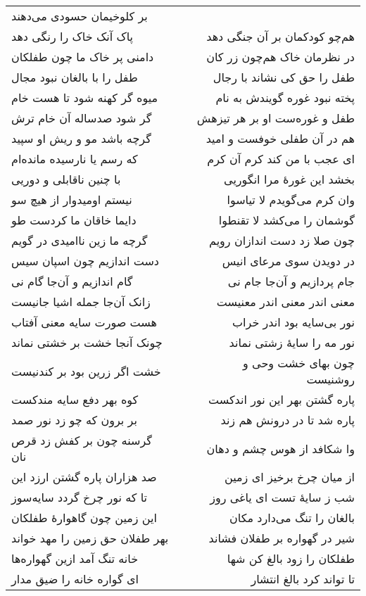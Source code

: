 \begin{center}
\begin{longtable}{l p{0.5cm} r}
بر کلوخیمان حسودی می‌دهند
\\
پاک آنک خاک را رنگی دهد
&&
هم‌چو کودکمان بر آن جنگی دهد
\\
دامنی پر خاک ما چون طفلکان
&&
در نظرمان خاک هم‌چون زر کان
\\
طفل را با بالغان نبود مجال
&&
طفل را حق کی نشاند با رجال
\\
میوه گر کهنه شود تا هست خام
&&
پخته نبود غوره گویندش به نام
\\
گر شود صدساله آن خام ترش
&&
طفل و غوره‌ست او بر هر تیزهش
\\
گرچه باشد مو و ریش او سپید
&&
هم در آن طفلی خوفست و امید
\\
که رسم یا نارسیده مانده‌ام
&&
ای عجب با من کند کرم آن کرم
\\
با چنین ناقابلی و دوریی
&&
بخشد این غورهٔ مرا انگوریی
\\
نیستم اومیدوار از هیچ سو
&&
وان کرم می‌گویدم لا تیاسوا
\\
دایما خاقان ما کردست طو
&&
گوشمان را می‌کشد لا تقنطوا
\\
گرچه ما زین ناامیدی در گویم
&&
چون صلا زد دست اندازان رویم
\\
دست اندازیم چون اسپان سیس
&&
در دویدن سوی مرعای انیس
\\
گام اندازیم و آن‌جا گام نی
&&
جام پردازیم و آن‌جا جام نی
\\
زانک آن‌جا جمله اشیا جانیست
&&
معنی اندر معنی اندر معنیست
\\
هست صورت سایه معنی آفتاب
&&
نور بی‌سایه بود اندر خراب
\\
چونک آنجا خشت بر خشتی نماند
&&
نور مه را سایهٔ زشتی نماند
\\
خشت اگر زرین بود بر کندنیست
&&
چون بهای خشت وحی و روشنیست
\\
کوه بهر دفع سایه مندکست
&&
پاره گشتن بهر این نور اندکست
\\
بر برون که چو زد نور صمد
&&
پاره شد تا در درونش هم زند
\\
گرسنه چون بر کفش زد قرص نان
&&
وا شکافد از هوس چشم و دهان
\\
صد هزاران پاره گشتن ارزد این
&&
از میان چرخ برخیز ای زمین
\\
تا که نور چرخ گردد سایه‌سوز
&&
شب ز سایهٔ تست ای یاغی روز
\\
این زمین چون گاهوارهٔ طفلکان
&&
بالغان را تنگ می‌دارد مکان
\\
بهر طفلان حق زمین را مهد خواند
&&
شیر در گهواره بر طفلان فشاند
\\
خانه تنگ آمد ازین گهواره‌ها
&&
طفلکان را زود بالغ کن شها
\\
ای گواره خانه را ضیق مدار
&&
تا تواند کرد بالغ انتشار
\\
\end{longtable}
\end{center}
